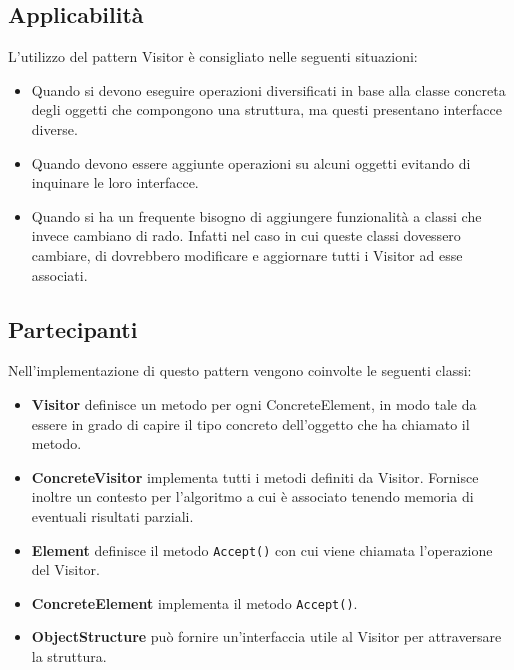 \subsection{Applicabilità}
L'utilizzo del pattern Visitor è consigliato nelle seguenti situazioni:
\begin{itemize}
\item Quando si devono eseguire operazioni diversificati in base alla classe concreta degli oggetti che compongono una struttura, ma questi presentano interfacce diverse.
\item Quando devono essere aggiunte operazioni su alcuni oggetti evitando di inquinare le loro interfacce.
\item Quando si ha un frequente bisogno di aggiungere funzionalità a classi che invece cambiano di rado. Infatti nel caso in cui queste classi dovessero cambiare, di dovrebbero modificare e aggiornare tutti i Visitor ad esse associati.
\end{itemize}

\subsection{Partecipanti}
Nell'implementazione di questo pattern vengono coinvolte le seguenti classi:
\begin{itemize}
\item \textbf{Visitor} definisce un metodo per ogni ConcreteElement, in modo tale da essere in grado di capire il tipo concreto dell'oggetto che ha chiamato il metodo.
\item \textbf{ConcreteVisitor} implementa tutti i metodi definiti da Visitor. Fornisce inoltre un contesto per l'algoritmo a cui è associato tenendo memoria di eventuali risultati parziali.
\item \textbf{Element} definisce il metodo \texttt{Accept()} con cui viene chiamata l'operazione del Visitor.
\item \textbf{ConcreteElement} implementa il metodo \texttt{Accept()}.
\item \textbf{ObjectStructure} può fornire un'interfaccia utile al Visitor per attraversare la struttura.
\end{itemize}

